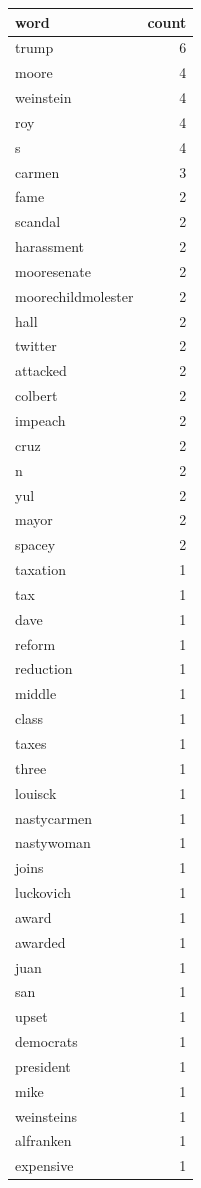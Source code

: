 \begin{tabular}{lr}
\toprule
word & count \\
\midrule
trump & 6 \\
moore & 4 \\
weinstein & 4 \\
roy & 4 \\
s & 4 \\
carmen & 3 \\
fame & 2 \\
scandal & 2 \\
harassment & 2 \\
mooresenate & 2 \\
moorechildmolester & 2 \\
hall & 2 \\
twitter & 2 \\
attacked & 2 \\
colbert & 2 \\
impeach & 2 \\
cruz & 2 \\
n & 2 \\
yul & 2 \\
mayor & 2 \\
spacey & 2 \\
taxation & 1 \\
tax & 1 \\
dave & 1 \\
reform & 1 \\
reduction & 1 \\
middle & 1 \\
class & 1 \\
taxes & 1 \\
three & 1 \\
louisck & 1 \\
nastycarmen & 1 \\
nastywoman & 1 \\
joins & 1 \\
luckovich & 1 \\
award & 1 \\
awarded & 1 \\
juan & 1 \\
san & 1 \\
upset & 1 \\
democrats & 1 \\
president & 1 \\
mike & 1 \\
weinsteins & 1 \\
alfranken & 1 \\
expensive & 1 \\

\end{tabular}
